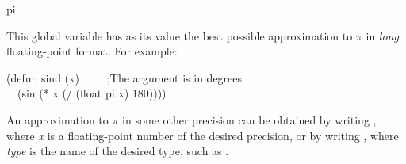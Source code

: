 \begin{defun}[Constant]
pi

This global variable has as its value the best possible approximation to
$\pi$ in {\it long} floating-point format.
For example:
\begin{lisp}
(defun sind (x)~~~~~;{\rm The argument is in degrees} \\
~~(sin (* x (/ (float pi x) 180))))
\end{lisp}
An approximation to $\pi$ in some other precision can
be obtained by writing , where {\it x} is a
floating-point number of the desired precision,
or by writing , where {\it type} is the
name of the desired type, such as .
\end{defun}

\relax

